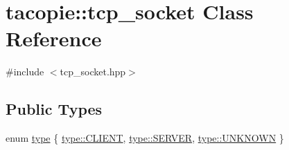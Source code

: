 \hypertarget{classtacopie_1_1tcp__socket}{}\section{tacopie\+:\+:tcp\+\_\+socket Class Reference}
\label{classtacopie_1_1tcp__socket}


{\ttfamily \#include $<$tcp\+\_\+socket.\+hpp$>$}

\subsection*{Public Types}
\begin{DoxyCompactItemize}
\item 
enum \hyperlink{classtacopie_1_1tcp__socket_ad8376e85df96ab9523f5d079ed7172ab}{type} \{ \hyperlink{classtacopie_1_1tcp__socket_ad8376e85df96ab9523f5d079ed7172abaef10c650df47bffd6399e5e78da2a9b1}{type\+::\+C\+L\+I\+E\+NT}, 
\hyperlink{classtacopie_1_1tcp__socket_ad8376e85df96ab9523f5d079ed7172aba3d27c95bfdbea691b250894d96852844}{type\+::\+S\+E\+R\+V\+ER}, 
\hyperlink{classtacopie_1_1tcp__socket_ad8376e85df96ab9523f5d079ed7172aba696b031073e74bf2cb98e5ef201d4aa3}{type\+::\+U\+N\+K\+N\+O\+WN}
 \}
\end{DoxyCompactItemize}
